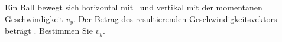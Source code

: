 Ein Ball bewegt sich horizontal mit \vxO\ und vertikal mit der momentanen Geschwindigkeit $v_y$. Der Betrag des resultierenden Geschwindigkeitsvektors beträgt \vrO. Bestimmen Sie $v_y$.
